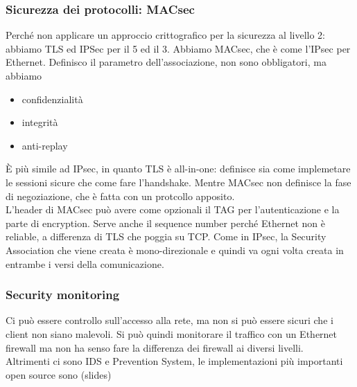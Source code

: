 \documentclass[12pt, oneside]{extbook} %
\begin{document}
\subsubsection{Sicurezza dei protocolli: MACsec}
Perché non applicare un approccio crittografico per la sicurezza al livello 2: abbiamo TLS ed IPSec per il 5 ed il 3. Abbiamo MACsec, che è come l'IPsec per Ethernet. Definisco il parametro dell'associazione, non sono obbligatori, ma abbiamo
\begin{itemize}
\item confidenzialità
\item integrità
\item anti-replay
\end{itemize}
È più simile ad IPsec, in quanto TLS è all-in-one: definisce sia come implemetare le sessioni sicure che come fare l'handshake. Mentre MACsec non definisce la fase di negoziazione, che è fatta con un protcollo apposito.\\ L'header di MACsec può avere come opzionali il TAG per l'autenticazione e la parte di encryption. Serve anche il sequence number perché Ethernet non è reliable, a differenza di TLS che poggia su TCP. Come in IPsec, la Security Association che viene creata è mono-direzionale e quindi va ogni volta creata in entrambe i versi della comunicazione.
\subsubsection{Security monitoring}
Ci può essere controllo sull'accesso alla rete, ma non si può essere sicuri che i client non siano malevoli. Si può quindi monitorare il traffico con un Ethernet firewall ma non ha senso fare la differenza dei firewall ai diversi livelli.\\ Altrimenti ci sono IDS e Prevention System, le implementazioni più importanti open source sono (slides)
\end{document}
